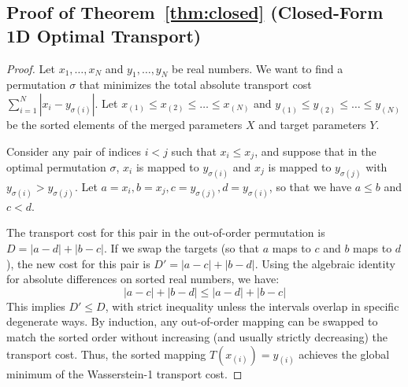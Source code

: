 \documentclass{article}
\theoremstyle{plain}
\theoremstyle{definition}
\theoremstyle{remark}
\begin{document}
\subsection{Proof of Theorem~\ref{thm:closed} (Closed-Form 1D Optimal Transport)}
\label{app:proof_closed}
\begin{proof}
  Let $x_1, \dots, x_N$ and $y_1, \dots, y_N$ be real numbers. We want to find a permutation $\sigma$ that minimizes the total absolute transport cost $\sum_{i=1}^N |x_i - y_{\sigma(i)}|$. 
  Let $x_{(1)} \leq x_{(2)} \leq \dots \leq x_{(N)}$ and $y_{(1)} \leq y_{(2)} \leq \dots \leq y_{(N)}$ be the sorted elements of the merged parameters $X$ and target parameters $Y$.
  
  Consider any pair of indices $i < j$ such that $x_i \leq x_j$, and suppose that in the optimal permutation $\sigma$, $x_i$ is mapped to $y_{\sigma(i)}$ and $x_j$ is mapped to $y_{\sigma(j)}$ with $y_{\sigma(i)} > y_{\sigma(j)}$. Let $a = x_i, b = x_j, c = y_{\sigma(j)}, d = y_{\sigma(i)}$, so that we have $a \leq b$ and $c < d$. 
  
  The transport cost for this pair in the out-of-order permutation is $D = |a - d| + |b - c|$. 
  If we swap the targets (so that $a$ maps to $c$ and $b$ maps to $d$), the new cost for this pair is $D' = |a - c| + |b - d|$.
  Using the algebraic identity for absolute differences on sorted real numbers, we have:
  \begin{equation}
    |a - c| + |b - d| \leq |a - d| + |b - c|
  \end{equation}
  This implies $D' \leq D$, with strict inequality unless the intervals overlap in specific degenerate ways. By induction, any out-of-order mapping can be swapped to match the sorted order without increasing (and usually strictly decreasing) the transport cost. Thus, the sorted mapping $T(x_{(i)}) = y_{(i)}$ achieves the global minimum of the Wasserstein-1 transport cost.
\end{proof}
\end{document}
